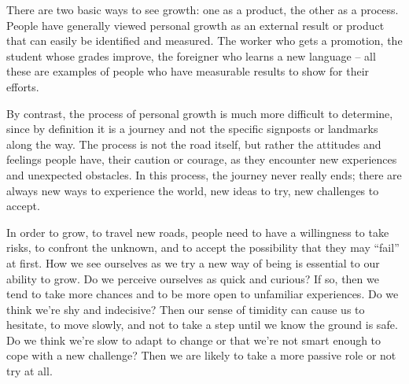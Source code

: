 \documentclass[a4paper]{article}
\begin{document}
\par
There are two basic ways to see growth: one as a product, the other as a process. People have generally viewed personal growth as an external result or product that can easily be identified and measured. The worker who gets a promotion, the student whose grades improve, the foreigner who learns a new language -- all these are examples of people who have measurable results to show for their efforts.

\par
By contrast, the process of personal growth is much more difficult to determine, since by definition it is a journey and not the specific signposts or landmarks along the way. The process is not the road itself, but rather the attitudes and feelings people have, their caution or courage, as they encounter new experiences and unexpected obstacles. In this process, the journey never really ends; there are always new ways to experience the world, new ideas to try, new challenges to accept.

\par
In order to grow, to travel new roads, people need to have a willingness to take risks, to confront the unknown, and to accept the possibility that they may “fail” at first. How we see ourselves as we try a new way of being is essential to our ability to grow. Do we perceive ourselves as quick and curious? If so, then we tend to take more chances and to be more open to unfamiliar experiences. Do we think we’re shy and indecisive? Then our sense of timidity can cause us to hesitate, to move slowly, and not to take a step until we know the ground is safe. Do we think we’re slow to adapt to change or that we’re not smart enough to cope with a new challenge? Then we are likely to take a more passive role or not try at all.
\end{document}
